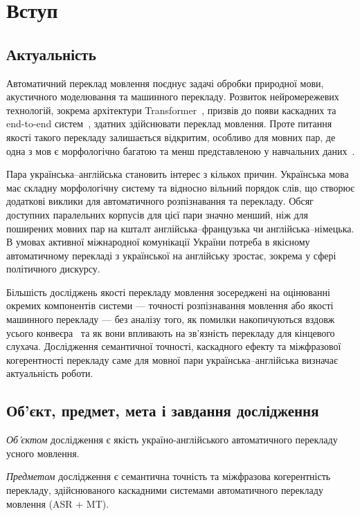 \setcounter{secnumdepth}{3}
\section{Вступ}

\subsection{Актуальність}

Автоматичний переклад мовлення поєднує задачі обробки природної мови,
акустичного моделювання та машинного перекладу.
Розвиток нейромережевих технологій, зокрема архітектури
Transformer~\cite{vaswani}, призвів до появи каскадних та end-to-end
систем~\cite{cascade_st, st_survey}, здатних здійснювати переклад
мовлення. Проте питання якості такого перекладу залишається відкритим,
особливо для мовних пар, де одна з мов є морфологічно багатою та менш
представленою у навчальних даних~\cite{low_resource_mt}.

Пара українська--англійська становить інтерес з кількох причин. Українська мова
має складну морфологічну систему та відносно вільний порядок слів, що створює
додаткові виклики для автоматичного розпізнавання та перекладу. Обсяг доступних
паралельних корпусів для цієї пари значно менший, ніж для поширених мовних
пар на кшталт англійська--французька чи англійська--німецька. В умовах активної
міжнародної комунікації України потреба в якісному автоматичному перекладі
з української на англійську зростає, зокрема у сфері політичного дискурсу.

Більшість досліджень якості перекладу мовлення зосереджені на оцінюванні
окремих компонентів системи --- точності розпізнавання мовлення або якості
машинного перекладу --- без аналізу того, як помилки накопичуються вздовж
усього конвеєра~\cite{error_propagation, bentivogli_cascade} та як вони
впливають на зв'язність перекладу для кінцевого слухача. Дослідження семантичної точності, каскадного ефекту та міжфразової
когерентності перекладу саме для мовної пари українська--англійська
визначає актуальність роботи.

\subsection{Об'єкт, предмет, мета і завдання дослідження}

\textit{Об'єктом} дослідження є якість україно-англійського автоматичного
перекладу усного мовлення.

\textit{Предметом} дослідження є семантична точність та міжфразова когерентність
перекладу, здійснюваного каскадними системами автоматичного перекладу мовлення
(ASR + MT).

